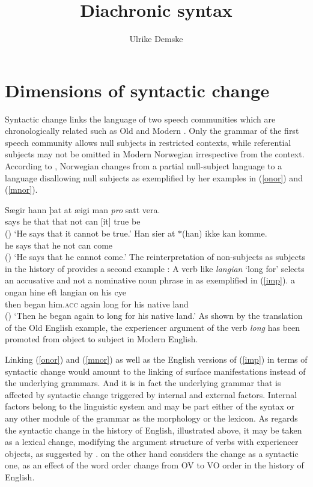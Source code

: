 \documentclass[output=paper
	        ,collection
	        ,collectionchapter
 	        ,biblatex
                ,babelshorthands
                ,newtxmath
                ,draftmode
                ,colorlinks, citecolor=brown
]{./langsci/langscibook}
\title{Diachronic syntax}
\author{%
 Ulrike Demske\affiliation{Universität Potsdam}
}
\begin{document}
\label{chap-diachronic}
\maketitle

\section{Dimensions of syntactic change} 

Syntactic change links the language of two speech communities which are chronologically related such as Old  and Modern . Only the grammar of the first speech community allows null subjects in restricted contexts, while referential subjects may not be omitted in Modern Norwegian irrespective from the context. According to \cite{kinn2015}, Norwegian changes from a partial null-subject language to a language disallowing null subjects as exemplified by her examples in (\ref{onor}) and (\ref{mnor}).

\eal 
\ex \label{onor}
\gll Sægir hann þat  at   æigi  man \textit{pro} satt vera.\\ 
     says  he   that that not   can [it] true be \\\hfill()
\glt `He says that it cannot be true.'  
\ex \label{mnor}
\gll Han sier at $*$(han) ikke kan komme.\\ 
     he says that he not can come \\ \hfill () 
\glt `He says that he cannot come.' 
\zl
The reinterpretation of non-subjects as subjects in the history of  provides a second example \citep{denison1993}: A verb like \textit{langian} `long for' selects an accusative and not a nominative noun phrase in  as exemplified in (\ref{imp}). 
\ea \label{imp}
\gll \th a ongan hine eft langian on his cy\th \th e  \\ then began him.\textsc{acc} again long for his {native land} \\ \hfill ()
\glt `Then he began again to long for his native land.' 
\z
As shown by the translation of the Old English example, the experiencer argument of the verb \textit{long} has been promoted from object to subject in Modern English. 

Linking (\ref{onor}) and (\ref{mnor}) as well as the English versions of (\ref{imp}) in terms of syntactic change would amount to the linking of surface manifestations instead of the underlying grammars. And it is in fact the underlying grammar that is affected by syntactic change triggered by internal and external factors. Internal factors belong to the linguistic system and may be part either of the syntax or any other module of the grammar as the morphology or the lexicon. As regards the syntactic change in the history of English, illustrated above, it may be taken as a lexical change, modifying the argument structure of verbs with experiencer objects, as suggested by \cite{denison1993}. \cite{lightfoot1979} on the other hand considers the change as a syntactic one, \ie as an effect of the word order change from OV to VO order in the history of English. 
\end{document}
